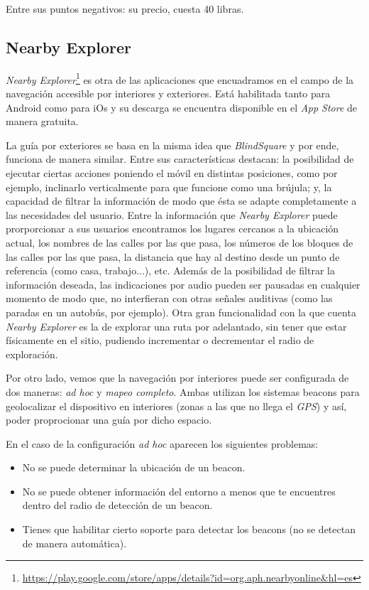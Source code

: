 Entre sus puntos negativos: su precio, cuesta 40 libras.

\subsection{Nearby Explorer}
\textit{Nearby Explorer}\footnote{\url{https://play.google.com/store/apps/details?id=org.aph.nearbyonline&hl=es}} es otra de las aplicaciones que encuadramos en el campo de la navegación accesible por interiores y exteriores. Está habilitada tanto para Android como para iOs y su descarga se encuentra disponible en el \textit{App Store} de manera gratuita. 

La guía por exteriores se basa en la misma idea que \textit{BlindSquare} y por ende, funciona de manera similar. Entre sus características destacan: la posibilidad de ejecutar ciertas acciones poniendo el móvil en distintas posiciones, como por ejemplo, inclinarlo verticalmente para que funcione como una brújula; y, la capacidad de filtrar la información de modo que ésta se adapte completamente a las necesidades del usuario. Entre la información que \textit{Nearby Explorer} puede prorporcionar a sus usuarios encontramos los lugares cercanos a la ubicación actual, los nombres de las calles por las que pasa, los números de los bloques de las calles por las que pasa, la distancia que hay al destino desde un punto de referencia (como casa, trabajo...), etc. Además de la posibilidad de filtrar la información deseada, las indicaciones por audio pueden ser pausadas en cualquier momento de modo que, no interfieran con otras señales auditivas (como las paradas en un autobús, por ejemplo). Otra gran funcionalidad con la que cuenta \textit{Nearby Explorer} es la de explorar una ruta por adelantado, sin tener que estar físicamente en el sitio, pudiendo incrementar o decrementar el radio de exploración.

Por otro lado, vemos que la navegación por interiores puede ser configurada de dos maneras: \textit{ad hoc} y \textit{mapeo completo}. Ambas utilizan los sistemas beacons para geolocalizar el dispositivo en interiores (zonas a las que no llega el \textit{GPS}) y así, poder proprocionar una guía por dicho espacio.

En el caso de la configuración \textit{ad hoc} aparecen los siguientes problemas:
\begin{itemize}
	\item No se puede determinar la ubicación de un beacon.
	\item No se puede obtener información del entorno a menos que te encuentres dentro del radio de detección de un beacon.
	\item Tienes que habilitar cierto soporte para detectar los beacons (no se detectan de manera automática).
\end{itemize}

